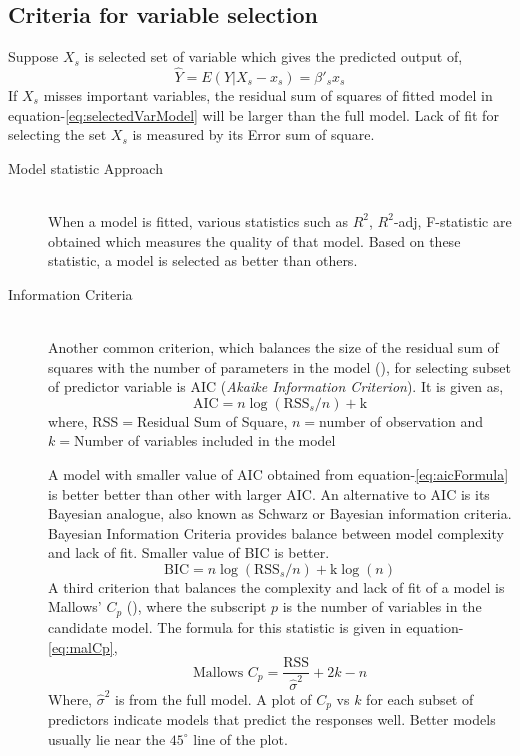 \documentclass[12pt, lot, lof]{thesis}\usepackage[]{graphicx}\usepackage[]{color}
\begin{document}
\subsection{Criteria for variable selection}
\label{ssec:vsCriteria}
Suppose $X_s$ is selected set of variable which gives the predicted output of,
\begin{equation}
\label{eq:selectedVarModel}
\hat{Y}=E\left(Y|X_s-x_s\right)=\beta'_s x_s
\end{equation}
If $X_s$ misses important variables, the residual sum of squares of fitted model in equation-\ref{eq:selectedVarModel} will be larger than the full model. Lack of fit for selecting the set $X_s$ is measured by its Error sum of square.
\begin{description}
\item[Model statistic Approach]\hfill\\
When a model is fitted, various statistics such as $R^2$, $R^2$-adj, F-statistic are obtained which measures the quality of that model. Based on these statistic, a model is selected as better than others.
\item[Information Criteria \label{itm:infCriteria}]\hfill \\
Another common criterion, which balances the size of the residual sum of squares with the number of parameters in the model (\cite[p.~386]{johnson2007applied}), for selecting subset of predictor variable is AIC (\textit{Akaike Information Criterion}). It is given as,
\begin{equation}
\label{eq:aicFormula}
\text{AIC} = n \log(\text{RSS}_s/n) + \text{k}
\end{equation}
where, RSS$=$Residual Sum of Square, $n=$number of observation and $k=$Number of variables included in the model

A model with smaller value of AIC obtained from equation-\ref{eq:aicFormula} is better better than other with larger AIC. An alternative to AIC is its Bayesian analogue, also known as Schwarz or Bayesian information criteria. Bayesian Information Criteria provides balance between model complexity and lack of fit. Smaller value of BIC is better.
\begin{equation}
\label{eq:bicFormula}
\text{BIC} = n \log(\text{RSS}_s/n) + \text{k} \log(n)
\end{equation}
A third criterion that balances the complexity and lack of fit of a model is Mallows’ $C_p$ (\cite{mallows1973some}), where the subscript $p$ is the number of variables in the candidate model. The formula for this statistic is given in equation-\ref{eq:malCp},
\begin{equation}
\label{eq:malCp}
\text{Mallows } C_p= \frac{\text{RSS}}{\hat{\sigma}^2} + 2k − n
\end{equation}
Where, $\hat{\sigma}^2$ is from the full model. A plot of $C_p$ vs $k$ for each subset of predictors indicate models that predict the responses well. Better models usually lie near the $45^\circ$ line of the plot.
\end{description}
\end{document}
